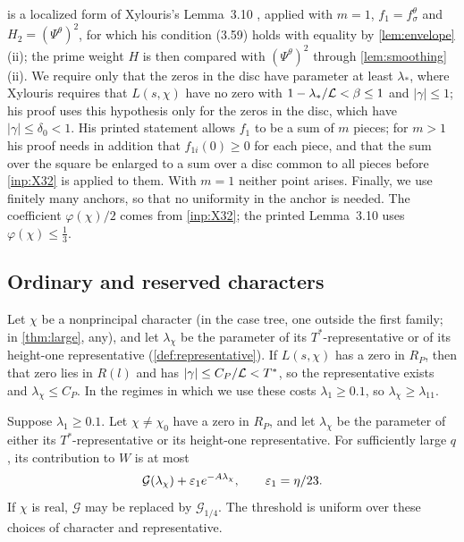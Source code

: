 \begin{remark}\label{rem:lemma310}
 is a localized form of Xylouris's Lemma~3.10 \cite[pp.~35--36]{Xylouris2011nullstellen},
applied with $m=1$, $f_1=f^\theta_\sigma$ and $H_2=(\Psi^\theta)^2$, for which his condition (3.59) holds
with equality by \cref{lem:envelope}(ii); the prime weight $H$ is then compared with $(\Psi^\theta)^2$
through \cref{lem:smoothing}(ii). We require only that the zeros in the disc have parameter at least
$\lambda_*$, where Xylouris requires that $L(s,\chi)$ have no zero with $1-\lambda_*/\mathcal{L}<\beta\le1$ and
$|\gamma|\le1$; his proof uses this hypothesis only for the zeros in the disc, which have
$|\gamma|\le\delta_0<1$. His printed statement allows $f_1$ to be a sum of $m$ pieces; for $m>1$ his proof
needs in addition that $f_{1i}(0)\ge0$ for each piece, and that the sum over the square be enlarged to
a sum over a disc common to all pieces before \cref{inp:X32} is applied to them. With $m=1$ neither
point arises. Finally, we use finitely many anchors, so that no uniformity in the anchor is needed.
The coefficient $\varphi(\chi)/2$ comes from \cref{inp:X32}; the printed Lemma~3.10 uses
$\varphi(\chi)\le\frac13$.
\end{remark}

\subsection{Ordinary and reserved characters}\label{subsec:ordinarycost}
Let $\chi$ be a nonprincipal character (in the case tree, one outside the first family; in
\cref{thm:large}, any), and let $\lambda_\chi$ be the parameter of its $T^*$-representative or of its
height-one representative (\cref{def:representative}). If $L(s,\chi)$ has a zero in $R_P$, then that zero lies in $R(l)$ and
has $|\gamma|\le C_P/\mathcal{L}<T^*$, so the representative exists and $\lambda_\chi\le C_P$. In the regimes
in which we use these costs $\lambda_1\ge0.1$, so $\lambda_\chi\ge\lambda_{11}$.

\begin{corollary}\label{cor:ordinarycost}
Suppose $\lambda_1\ge0.1$. Let $\chi\ne\chi_0$ have a zero in $R_P$, and let
$\lambda_\chi$ be the parameter of either its $T^*$-representative or its height-one
representative. For sufficiently large $q$, its contribution to $W$ is at most
\[
  \mathcal G(\lambda_\chi)+\varepsilon_1e^{-A\lambda_\chi},\qquad \varepsilon_1=\eta/23.
\]
If $\chi$ is real, $\mathcal G$ may be replaced by $\mathcal G_{1/4}$.
The threshold is uniform over these choices of character and representative.
\end{corollary}


